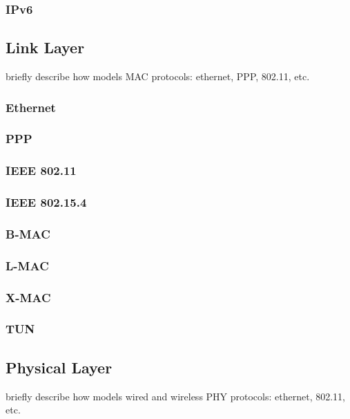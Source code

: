 %
\subsubsection*{IPv6}
%


%
\subsection{Link Layer}
%
briefly describe how \inet models MAC protocols: ethernet, PPP, 802.11, etc.

%
\subsubsection*{Ethernet}
%

%
\subsubsection*{PPP}
%

%
\subsubsection*{IEEE 802.11}
%

%
\subsubsection*{IEEE 802.15.4}
%

%
\subsubsection*{B-MAC}
%

%
\subsubsection*{L-MAC}
%

%
\subsubsection*{X-MAC}
%

%
\subsubsection*{TUN}
%

%
\subsection{Physical Layer}
%
briefly describe how \inet models wired and wireless PHY protocols: ethernet, 802.11, etc.

